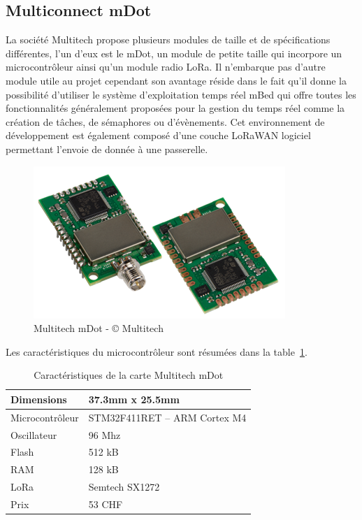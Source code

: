 \subsection{Multiconnect mDot}

La société Multitech propose plusieurs modules de taille et de spécifications différentes, l’un d’eux est le mDot, un module de petite taille qui incorpore un microcontrôleur ainsi qu’un module radio LoRa. Il n’embarque pas d’autre module utile au projet cependant son avantage réside dans le fait qu’il donne la possibilité d’utiliser le système d’exploitation temps réel mBed qui offre toutes les fonctionnalités généralement proposées pour la gestion du temps réel comme la création de tâches, de sémaphores ou d’évènements. Cet environnement de développement est également composé d’une couche LoRaWAN logiciel permettant l’envoie de donnée à une passerelle.

\begin{figure}[htb]
\centering 
\includegraphics[width=0.5\columnwidth]{../images/Multitech-mDot.png} 
\caption[Multitech mDot]{Multitech mDot - © Multitech}
\label{fig:multitech_mdot}
\end{figure}

Les caractéristiques du microcontrôleur sont résumées dans la table~\ref{tab:multitech_mdot_cara}.

\begin{table}[htb]
\caption[Caractéristiques de la carte Multitech mDot]{Caractéristiques de la carte Multitech mDot}
\label{tab:multitech_mdot_cara}
\centering
\begin{tabular}{ l | l }
\toprule
Dimensions & 37.3mm x 25.5mm \\
\midrule
Microcontrôleur & STM32F411RET – ARM Cortex M4 \\
\midrule
Oscillateur & 96 Mhz \\
\midrule
Flash & 512 kB \\
\midrule
RAM & 128 kB \\
\midrule
LoRa & Semtech SX1272 \\
\midrule
Prix & 53 CHF\\
\bottomrule 
\end{tabular}
\end{table}

